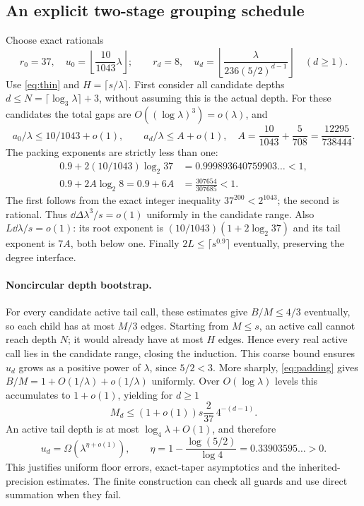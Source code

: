 \subsection{An explicit two-stage grouping schedule}
Choose exact rationals
\begin{equation}\label{eq:schedule}
 r_0=37,\quad u_0=\left\lfloor\frac{10}{1043}\lambda\right\rfloor;
 \qquad r_d=8,\quad
 u_d=\left\lfloor\frac{\lambda}{236(5/2)^{d-1}}\right\rfloor\quad(d\ge1).
\end{equation}
Use \eqref{eq:thin} and $H=\lceil s/\lambda\rceil$.
First consider all candidate depths $d\le N=\lceil\log_3\lambda\rceil+3$,
without assuming this is the actual depth. For these candidates the total gaps are
$O((\log\lambda)^3)=o(\lambda)$, and
\[
 a_0/\lambda\le10/1043+o(1),\qquad
 a_d/\lambda\le A+o(1),\quad
 A=\frac{10}{1043}+\frac5{708}=\frac{12295}{738444}.
\]
The packing exponents are strictly less than one:
\begin{align}
 0.9+2(10/1043)\log_2 37&=0.999893640759903\ldots<1,\label{eq:rootexp}\\
 0.9+2A\log_2 8=0.9+6A&=\frac{307654}{307685}<1.\label{eq:tailexp}
\end{align}
The first follows from the exact integer inequality $37^{200}<2^{1043}$;
the second is rational. Thus $\dd\Delta\lambda^3/s=o(1)$ uniformly in the candidate
range. Also $L\dd\lambda/s=o(1)$: its root exponent is
$(10/1043)(1+2\log_2 37)$ and its tail exponent is $7A$, both below one.
Finally $2L\le\lceil s^{0.9}\rceil$ eventually, preserving the degree interface.

\paragraph{Noncircular depth bootstrap.}
For every candidate active tail call, these estimates give $B/M\le4/3$ eventually,
so each child has at most $M/3$ edges. Starting from $M\le s$, an active call cannot
reach depth $N$; it would already have at most $H$ edges. Hence every real active call
lies in the candidate range, closing the induction. This coarse bound ensures
$u_d$ grows as a positive power of $\lambda$, since $5/2<3$.
More sharply, \eqref{eq:padding} gives
$B/M=1+O(1/\lambda)+o(1/\lambda)$ uniformly. Over $O(\log\lambda)$ levels this
accumulates to $1+o(1)$, yielding for $d\ge1$
\begin{equation}\label{eq:pathsize}
 M_d\le(1+o(1))s\frac2{37}\,4^{-(d-1)}.
\end{equation}
An active tail depth is at most $\log_4\lambda+O(1)$, and therefore
\[
 u_d=\Omega(\lambda^{\eta+o(1)}),\qquad
 \eta=1-\frac{\log(5/2)}{\log4}=0.33903595\ldots>0.
\]
This justifies uniform floor errors, exact-taper asymptotics and the inherited-precision estimates.
The finite construction can check all guards and use direct summation when they fail.

